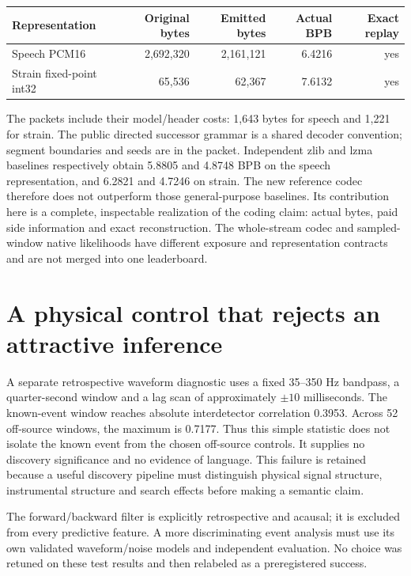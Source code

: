\begin{center}
\begin{tabular}{lrrrr}
\toprule
Representation & Original bytes & Emitted bytes & Actual BPB & Exact replay\\
\midrule
Speech PCM16 & 2,692,320 & 2,161,121 & 6.4216 & yes\\
Strain fixed-point int32 & 65,536 & 62,367 & 7.6132 & yes\\
\bottomrule
\end{tabular}
\end{center}

The packets include their model/header costs: 1,643 bytes for speech and 1,221 for strain. The public directed successor grammar is a shared decoder convention; segment boundaries and seeds are in the packet. Independent zlib and lzma baselines respectively obtain 5.8805 and 4.8748 BPB on the speech representation, and 6.2821 and 4.7246 on strain. The new reference codec therefore does not outperform those general-purpose baselines. Its contribution here is a complete, inspectable realization of the coding claim: actual bytes, paid side information and exact reconstruction. The whole-stream codec and sampled-window native likelihoods have different exposure and representation contracts and are not merged into one leaderboard.

\section{A physical control that rejects an attractive inference}

A separate retrospective waveform diagnostic uses a fixed 35--350 Hz bandpass, a quarter-second window and a lag scan of approximately $\pm10$ milliseconds. The known-event window reaches absolute interdetector correlation 0.3953. Across 52 off-source windows, the maximum is 0.7177. Thus this simple statistic does not isolate the known event from the chosen off-source controls. It supplies no discovery significance and no evidence of language. This failure is retained because a useful discovery pipeline must distinguish physical signal structure, instrumental structure and search effects before making a semantic claim.

The forward/backward filter is explicitly retrospective and acausal; it is excluded from every predictive feature. A more discriminating event analysis must use its own validated waveform/noise models and independent evaluation. No choice was retuned on these test results and then relabeled as a preregistered success.

